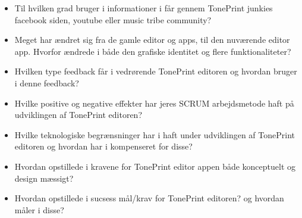 \begin{itemize}
  \item Til hvilken grad bruger i informationer i får gennem TonePrint junkies facebook siden, youtube eller music tribe community? 
  \item Meget har ændret sig fra de gamle editor og apps, til den nuværende editor app. Hvorfor ændrede i både den grafiske identitet og flere funktionaliteter?
  \item Hvilken type feedback får i vedrørende TonePrint editoren og hvordan bruger i denne feedback?
  \item Hvilke positive og negative effekter har jeres SCRUM arbejdsmetode haft på udviklingen af TonePrint editoren?
  \item Hvilke teknologiske begrænsninger har i haft under udviklingen af TonePrint editoren og hvordan har i kompenseret for disse?
  \item Hvordan opstillede i kravene for TonePrint editor appen både konceptuelt og design mæssigt?
  \item Hvordan opstillede i sucsess mål/krav for TonePrint editoren? og hvordan måler i disse?  
\end{itemize}

